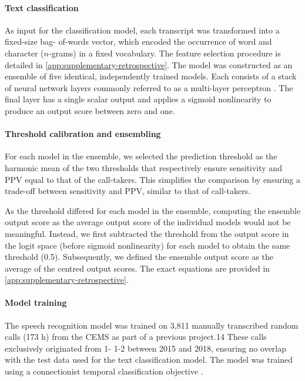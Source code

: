 {\paragraph{Text classification}

As input for the classification model, each transcript was transformed into a fixed-size bag- of-words vector, which encoded the occurrence of word and character ($n$-grams) in a fixed vocabulary. The feature selection procedure is detailed in \cref{app:supplementary-retrospective}. The model was constructed as an ensemble \parencite{hansen_neural_1990} of five identical, independently trained models. Each consists of a stack of neural network layers commonly referred to as a multi-layer perceptron \parencite{rosenblatt_perceptron_1958}. The final layer has a single scalar output and applies a sigmoid nonlinearity to produce an output score between zero and one.


\paragraph{Threshold calibration and ensembling}

For each model in the ensemble, we selected the prediction threshold as the harmonic mean of the two thresholds that respectively ensure sensitivity and PPV equal to that of the call-takers. This simplifies the comparison by ensuring a trade-off between sensitivity and PPV, similar to that of call-takers.

As the threshold differed for each model in the ensemble, computing the ensemble output score as the average output score of the individual models would not be meaningful. Instead, we first subtracted the threshold from the output score in the logit space (before sigmoid nonlinearity) for each model to obtain the same threshold (0.5). Subsequently, we defined the ensemble output score as the average of the centred output scores. The exact equations are provided in \cref{app:supplementary-retrospective}.


\paragraph{Model training}

The speech recognition model was trained on 3,811 manually transcribed random calls (173 h) from the CEMS as part of a previous project.14 These calls exclusively originated from 1- 1-2 between 2015 and 2018, ensuring no overlap with the test data used for the text classification model. The model was trained using a connectionist temporal classification objective \parencite{graves_connectionist_2006}.

}
